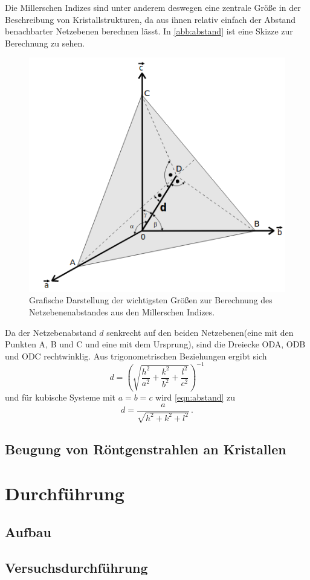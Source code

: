 Die Millerschen Indizes sind unter anderem deswegen eine zentrale Größe in der Beschreibung
von Kristallstrukturen, da aus ihnen relativ einfach der Abstand benachbarter Netzebenen
berechnen lässt. In \autoref{abb:abstand} ist eine Skizze zur Berechnung zu sehen.
\begin{figure}
  \centering
  \includegraphics[scale=0.5]{content/pics/netzebenenabstand.png}
  \caption{Grafische Darstellung der wichtigsten Größen zur Berechnung des Netzebenenabstandes
  aus den Millerschen Indizes. \cite{anleitung}}
  \label{abb:abstand}
\end{figure}
Da der Netzebenabstand $d$ senkrecht auf den beiden Netzebenen(eine mit den Punkten
A, B und C und eine mit dem Ursprung), sind die Dreiecke ODA, ODB und ODC rechtwinklig.
Aus trigonometrischen Beziehungen ergibt sich
\begin{equation}
  d = \left(\sqrt{\frac{h^2}{a^2} + \frac{k^2}{b^2} + \frac{l^2}{c^2}}\right)^{-1}
  \label{eqn:abstand}
\end{equation}
und für kubische Systeme mit $a = b = c$ wird \eqref{eqn:abstand} zu
\begin{equation}
  d = \frac{a}{\sqrt{h^2 + k^2 + l^2}} \, .
  \label{eqn:abstand_kubisch}
\end{equation}
\pagebreak
\subsection{Beugung von Röntgenstrahlen an Kristallen}

\section{Durchführung}
\subsection{Aufbau}
\subsection{Versuchsdurchführung}
